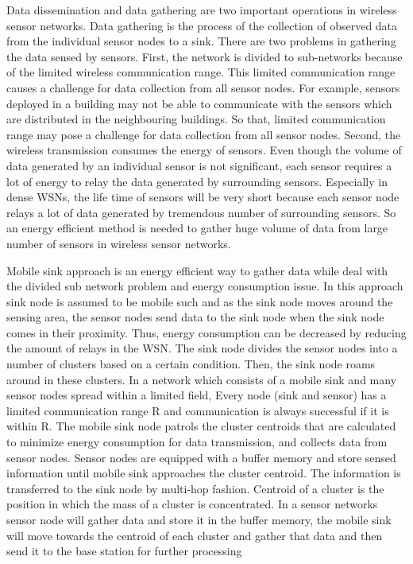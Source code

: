 \documentclass[MTech]{iitmdiss}
\begin{document}
                 Data dissemination and data gathering are two important operations in wireless sensor networks. Data gathering is the process of the collection of observed data from the individual sensor nodes to a sink. There are two problems in gathering the data sensed by sensors. First, the network is divided to sub-networks because of the limited wireless communication range. This limited communication range causes a challenge for data collection from all sensor nodes. For example, sensors deployed in a building may not be able to communicate with the sensors which are distributed in the neighbouring buildings. So that, limited communication range may pose a challenge for data collection from all sensor nodes. Second, the wireless transmission consumes the energy of sensors. Even though the volume of data generated by an individual sensor is not significant, each sensor requires a lot of energy to relay the data generated by surrounding sensors. Especially in dense WSNs, the life time of sensors will be very short because each sensor node relays a lot of data generated by tremendous number of surrounding sensors. So an energy efficient method is needed to gather huge volume of data from large number of sensors in wireless sensor networks.
               

 Mobile sink approach is an energy efficient way to gather data while deal with the divided sub network problem and energy consumption issue. In this approach sink node is assumed to be mobile such and as the sink node moves around the sensing area, the sensor nodes send data to the sink node when the sink node comes in their proximity. Thus, energy consumption can be decreased by reducing the amount of relays in the WSN. The sink node divides the sensor nodes into a number of clusters based on a certain condition. Then, the sink node roams around in these clusters. In  a network which consists of a mobile sink and many sensor nodes spread within a limited field, Every node (sink and sensor) has a limited communication range R and communication is always successful if it is within R. The mobile sink node patrols the cluster centroids that are calculated to minimize energy consumption for data transmission, and collects data from sensor nodes. Sensor nodes are equipped with a buffer memory and store sensed information until mobile sink approaches the cluster centroid. The information is transferred to the sink node by multi-hop fashion. Centroid of a cluster is the position in which the mass of a cluster is concentrated. In a sensor networks sensor node will gather data and store it in the buffer memory, the mobile sink will move towards the centroid of each cluster and gather that data and then send it to the base station for further processing
\end{document}
